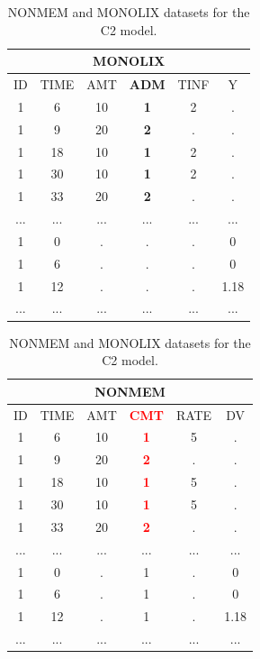 \begin{table}[h!]
\footnotesize
\parbox{.5\linewidth}{
\centering
\begin{tabular}{cccccc}
  \hline
   \multicolumn{6}{c}{\textbf{MONOLIX}} \\
  \hline
ID	& TIME  & AMT	 & \textbf{ADM} &  TINF &	Y \\
  \hline
1	& 6	    & 10	& \textbf{1}	 & 2	 & . \\
1	& 9	    & 20	& \textbf{2}	 & .	 & . \\
1	& 18	    & 10	& \textbf{1}	 & 2	 & . \\
1	& 30	    & 10	& \textbf{1}	 & 2	 & . \\
1	& 33	    & 20	& \textbf{2}	 & .	 & . \\
...     &  ...     &  ...     &  ...  & ...  & ... \\
1	& 0	    & .	& .	& .	& 0 \\
1	& 6	    & .	& .	& .	& 0 \\
1	& 12	    & .	& .	& .	& 1.18 \\
...     &  ...     &  ...     & ...  & ...  & ...\\
\end{tabular}
}
\hfill
\parbox{.5\linewidth}{
\centering
\begin{tabular}{cccccc}
  \hline
   \multicolumn{6}{c}{\textbf{NONMEM}} \\
  \hline
ID	& TIME  & AMT	 & \textbf{\textcolor{red}{CMT}} &  RATE &	DV \\
  \hline
1	& 6	    & 10	& \textbf{\textcolor{red}{1}}	 & 5	 & . \\
1	& 9	    & 20	& \textbf{\textcolor{red}{2}}	 & .	 & . \\
1	& 18	    & 10	& \textbf{\textcolor{red}{1}}	 & 5	 & . \\
1	& 30	    & 10	& \textbf{\textcolor{red}{1}}	 & 5	 & . \\
1	& 33	    & 20	& \textbf{\textcolor{red}{2}}	 & .	 & . \\
...     &  ...     &  ...     &  ...  & ...  & ... \\
1	& 0	    & .	& 1	& .	& 0 \\
1	& 6	    & .	& 1	& .	& 0 \\
1	& 12	    & .	& 1	& .	& 1.18 \\
...     &  ...     &  ...     & ...  & ...  & ...\\
\end{tabular}
}
\caption{NONMEM and MONOLIX datasets for the C2 model.}
\end{table}


